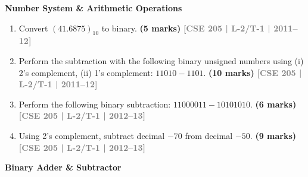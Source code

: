 \documentclass[12pt,a4paper]{article}
\newcommand{\yr}[1]{\hfill\textcolor{gray}{\small\textbf{[#1]}}}
\newcommand{\mk}[1]{\textcolor{orange!70!black}{\small\textbf{(#1 marks)}}}
\newcommand{\subtopic}[2]{%
  \vspace{10pt}
  \noindent\begin{tcolorbox}[colback=#1!8,colframe=#1,boxrule=0.6pt,arc=4pt,
    left=6pt,right=6pt,top=4pt,bottom=4pt]
    \small\bfseries\textcolor{#1}{#2}
  \end{tcolorbox}
  \vspace{2pt}
}
\begin{document}
\subtopic{cD}{Number System \& Arithmetic Operations}
\label{sub:s4-number-sys}

\begin{enumerate}

\item Convert $(41.6875)_{10}$ to binary.
\mk{5} \yr{CSE 205 | L-2/T-1 | 2011--12}

\item Perform the subtraction with the following binary unsigned numbers using (i) 2's complement, (ii) 1's complement: $11010 - 1101$.
\mk{10} \yr{CSE 205 | L-2/T-1 | 2011--12}

\item Perform the following binary subtraction: $11000011 - 10101010$.
\mk{6} \yr{CSE 205 | L-2/T-1 | 2012--13}

\item Using 2's complement, subtract decimal $-70$ from decimal $-50$.
\mk{9} \yr{CSE 205 | L-2/T-1 | 2012--13}

\end{enumerate}

\subtopic{cD}{Binary Adder \& Subtractor}
\label{sub:s4-adder-sub}
\end{document}
